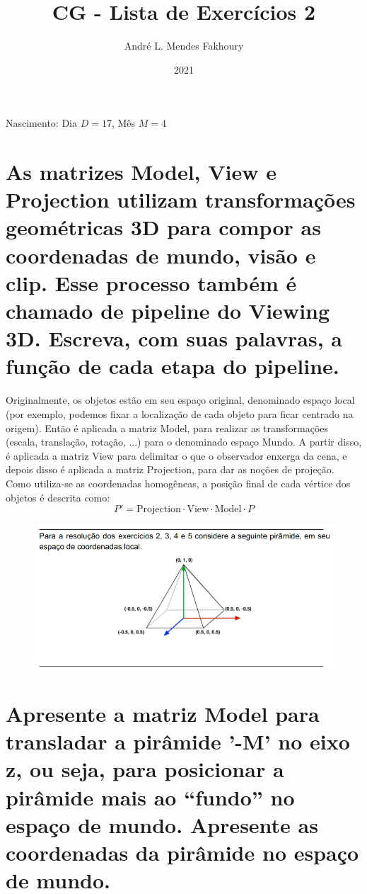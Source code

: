\documentclass{article}
\title{CG - Lista de Exercícios 2}
\author{André L. Mendes Fakhoury}
\date{2021}
\begin{document}
\maketitle

Nascimento: Dia $D = 17$, Mês $M = 4$

\section{As matrizes Model, View e Projection utilizam transformações geométricas 3D para compor as coordenadas de mundo, visão e clip. Esse processo também é chamado de pipeline do Viewing 3D. Escreva, com suas palavras, a função de cada etapa do pipeline.}

Originalmente, os objetos estão em seu espaço original, denominado espaço local (por exemplo, podemos fixar a localização de cada objeto para ficar centrado na origem). Então é aplicada a matriz Model, para realizar as transformações (escala, translação, rotação, ...) para o denominado espaço Mundo. A partir disso, é aplicada a matriz View para delimitar o que o observador enxerga da cena, e depois disso é aplicada a matriz Projection, para dar as noções de projeção. Como utiliza-se as coordenadas homogêneas, a posição final de cada vértice dos objetos é descrita como:
$$P' = \text{Projection} \cdot \text{View} \cdot \text{Model} \cdot P$$

\begin{figure}[h!]
	\centering
	\includegraphics[scale=0.6]{img/piramide.png}
\end{figure}

\section{Apresente a matriz Model para transladar a pirâmide '-M' no eixo z, ou seja, para posicionar a pirâmide mais ao “fundo” no espaço de mundo. Apresente as coordenadas da pirâmide no espaço de mundo.}
\end{document}
